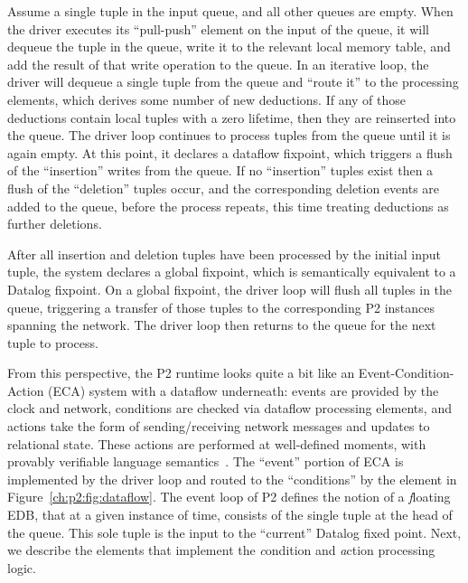 Assume a single tuple in the  input queue, and all other queues are
empty.  When the driver executes its ``pull-push'' element on the input of the
 queue, it will dequeue the tuple in the  queue, write it
to the relevant local memory table, and add the result of that write operation
to the  queue.  In an iterative loop, the driver will dequeue a
single tuple from the  queue and ``route it'' to the processing
elements, which derives some number of new deductions.  If any of those
deductions contain local tuples with a zero lifetime, then they are reinserted
into the  queue.  The driver loop continues to process tuples from
the  queue until it is again empty.  At this point, it declares a
dataflow fixpoint, which triggers a flush of the ``insertion'' writes from the
 queue.  If no ``insertion'' tuples exist then a flush of the
``deletion'' tuples occur, and the corresponding deletion events are added to
the  queue, before the process repeats, this time treating deductions
as further deletions.

After all insertion and deletion tuples have been processed by the initial
 input tuple, the system declares a global fixpoint, which is
semantically equivalent to a Datalog fixpoint.  On a global fixpoint, the
driver loop will flush all tuples in the  queue, triggering a
transfer of those tuples to the corresponding P2 instances spanning the
network.  The driver loop then returns to the  queue for the next
tuple to process.

From this perspective, the P2 runtime looks quite a bit like an
Event-Condition-Action (ECA) system with a dataflow underneath: events are
provided by the clock and network, conditions are checked via dataflow
processing elements, and actions take the form of sending/receiving network
messages and updates to relational state.  These actions are performed at
well-defined moments, with provably verifiable language
semantics~\cite{boon-thesis}.  The ``event'' portion of ECA is implemented by
the driver loop and routed to the ``conditions'' by the  element in
Figure~\ref{ch:p2:fig:dataflow}.  The event loop of P2 defines the notion of a
{\emph floating} EDB, that at a given instance of time, consists of the single
tuple at the head of the  queue.  This sole tuple is the input to the
``current'' Datalog fixed point.  Next, we describe the elements that implement
the {\emph condition} and {\emph action} processing logic.

